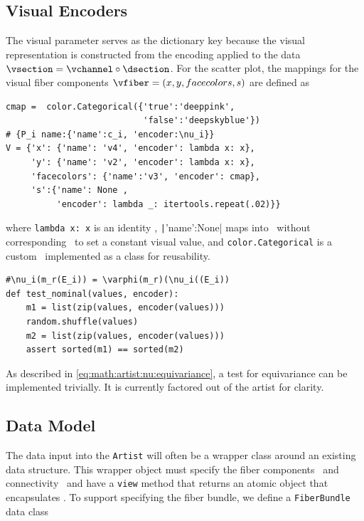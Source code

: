 \documentclass[../main.tex]{subfiles}
\begin{document}
\subsection{Visual Encoders}
\label{sec:code:nu}
The visual parameter serves as the dictionary key because the visual representation is constructed from the encoding applied to the data  $\vsection = \vchannel \circ \dsection$. For the scatter plot, the mappings for the visual fiber components $\vfiber=(x,y, facecolors, s)$ are defined as
\begin{verbatim}
cmap =  color.Categorical({'true':'deeppink', 
                           'false':'deepskyblue'}) 
# {P_i name:{'name':c_i, 'encoder:\nu_i}}
V = {'x': {'name': 'v4', 'encoder': lambda x: x}, 
     'y': {'name': 'v2', 'encoder': lambda x: x},
     'facecolors': {'name':'v3', 'encoder': cmap}, 
     's':{'name': None , 
          'encoder': lambda _: itertools.repeat(.02)}}
\end{verbatim}
where \texttt{lambda x: x} is an identity \vchannel, \texttt|{'name':None}| maps into \vfiber\ without corresponding \dsection\ to set a constant visual value, and \texttt{color.Categorical} is a custom \vchannel\ implemented as a class for reusability. 
\begin{verbatim}
#\nu_i(m_r(E_i)) = \varphi(m_r)(\nu_i((E_i))
def test_nominal(values, encoder):
    m1 = list(zip(values, encoder(values)))
    random.shuffle(values)
    m2 = list(zip(values, encoder(values)))
    assert sorted(m1) == sorted(m2)
\end{verbatim}
As described in \autoref{eq:math:artist:nu:equivariance}, a test for equivariance can be implemented trivially. It is currently factored out of the artist for clarity. 

\subsection{Data Model}
\label{sec:code:data}
The data input into the \texttt{Artist} will often be a wrapper class around an existing data structure. This wrapper object must specify the fiber components \dfiber\ and connectivity \dbase\ and have a \texttt{view} method that returns an atomic object that encapsulates \dsection. To support specifying the fiber bundle, we define a \texttt{FiberBundle} data class\cite{DataclassesDataClasses}
\end{document}
